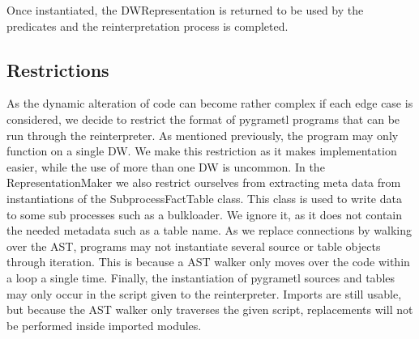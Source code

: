 Once instantiated, the DWRepresentation is returned to be used by the predicates and the reinterpretation process is completed.

\subsection{Restrictions}
As the dynamic alteration of code can become rather complex if each edge case is considered, we decide to restrict the format of pygrametl programs that can be run through the reinterpreter. As mentioned previously, the program may only function on a single DW. We make this restriction as it makes implementation easier, while the use of more than one DW is uncommon. In the RepresentationMaker we also restrict ourselves from extracting meta data from instantiations of the SubprocessFactTable class. This class is used to write data to some sub processes such as a bulkloader. We ignore it, as it does not contain the needed metadata such as a table name. As we replace connections by walking over the AST, programs may not instantiate several source or table objects through iteration. This is because a AST walker only moves over the code within a loop a single time. Finally, the instantiation of pygrametl sources and tables may only occur in the script given to the reinterpreter. Imports are still usable, but because the AST walker only traverses the given script, replacements will not be performed inside imported modules.   

